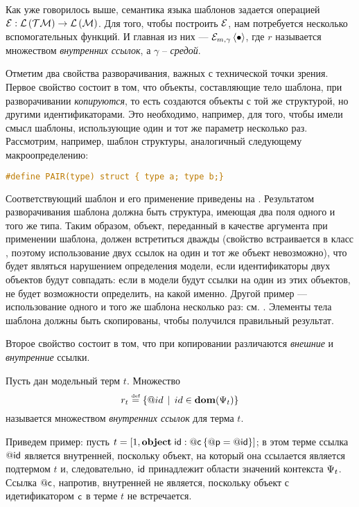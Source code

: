Как уже говорилось выше, семантика языка шаблонов задается операцией  $\mathcal{E} : \mathcal{L}\left(\mathcal{TM}\right) \rightarrow \mathcal{L}\left(\mathcal{M}\right)$. Для того, чтобы построить $\mathcal{E}$, нам потребуется несколько вспомогательных функций. И главная из них --- $\mathcal{E}_{m, \gamma} \left\langle \bullet \right\rangle$, где $r$ называется множеством \emph{внутренних ссылок}, а $\gamma$ -- \emph{средой}.

Отметим два свойства разворачивания, важных с технической точки зрения. Первое свойство состоит в том, что объекты, составляющие тело шаблона, при разворачивании \emph{копируются}, то есть создаются объекты с той же структурой, но другими идентификаторами. Это необходимо, например, для того, чтобы имели смысл шаблоны, использующие один и тот же параметр несколько раз. Рассмотрим, например, шаблон структуры, аналогичный следующему макроопределению:
\begin{lstlisting}[language=C]
#define PAIR(type) struct { type a; type b;}
\end{lstlisting}
%
%
Соответствующий шаблон и его применение приведены на . Результатом разворачивания шаблона должна быть структура, имеющая два поля одного и того же типа. Таким образом, объект, переданный в качестве аргумента при применении шаблона, должен встретиться дважды (свойство  встраивается в класс , поэтому использование двух ссылок на один и тот же объект невозможно), что будет являться нарушением определения модели, если идентификаторы двух объектов будут совпадать: если в модели будут ссылки на один из этих объектов, не будет возможности определить, на какой именно. Другой пример --- использование одного и того же шаблона несколько раз: см. . Элементы тела шаблона должны быть скопированы, чтобы получился правильный результат.

Второе свойство состоит в том, что при копировании различаются \emph{внешние} и \emph{внутренние} ссылки.
\begin{Def}
Пусть дан модельный терм $t$. Множество 
$$
r_t \stackrel{\text{\tiny def}}{=} \left\{ @id \;\,|\;\, id \in \mathbf{dom}(\Psi_t) \right\}
$$
называется множеством \emph{внутренних ссылок} для терма $t$.
\end{Def}
Приведем пример: пусть 
$t = \left[1, \mathbf{object}\;\mathsf{id} : @\mathsf{c}\left\{ @\mathsf{p} = @\mathsf{id} \right\}\right]$; в этом терме ссылка $@\mathsf{id}$ является внутренней, поскольку объект, на который она ссылается является подтермом $t$ и, следовательно, $\mathsf{id}$ принадлежит области значений контекста $\Psi_t$. Ссылка $@\mathsf{c}$, напротив, внутренней не является, поскольку объект с идетификатором $\mathsf{c}$ в терме $t$ не встречается.

